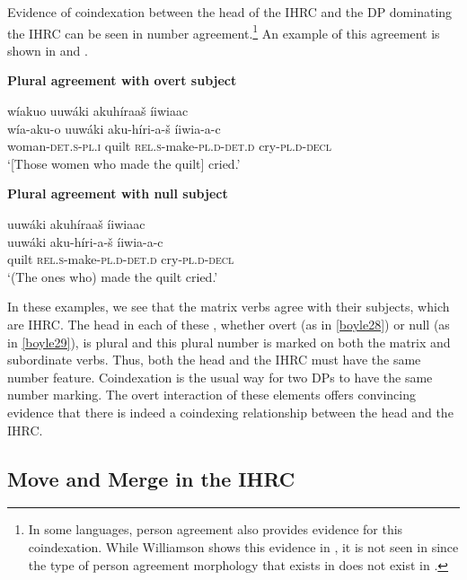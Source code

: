 \documentclass[output=paper]{LSP/langsci}
\begin{document}
Evidence of coindexation between the head of the IHRC and the DP dominating the IHRC can be seen in number agreement.\footnote{In some languages, person agreement also provides evidence for this coindexation. While Williamson shows this evidence in , it is not seen in  since the type of person agreement morphology that exists in  does not exist in .}  An example of this agreement is shown in  and .

\ea \textbf{Plural agreement with overt subject} \label{boyle28}

\glll w\'iakuo uuw\'aki akuh\'iraa\v{s} \'iiwiaac\\
w\'ia-aku-o  uuw\'aki aku-h\'iri-a-\v{s}    \'iiwia-a-c\\
woman-\textsc{det.s-pl.i}  quilt  \textsc{rel.s}-make-\textsc{pl.d-det.d} cry-\textsc{pl.d-decl}\\
\trans `[Those women who made the quilt] cried.'
\z

\ea \textbf{Plural agreement with null subject} \label{boyle29}

\glll uuw\'aki akuh\'iraa\v{s} \'iiwiaac\\
uuw\'aki aku-h\'iri-a-\v{s}   \'iiwia-a-c\\
quilt     \textsc{rel.s}-make-\textsc{pl.d}-\textsc{det.d} cry-\textsc{pl.d-decl}\\
\trans `(The ones who) made the quilt cried.'	
\z

In these examples, we see that the matrix verbs agree with their subjects, which are IHRC. The head in each of these , whether overt (as in \ref{boyle28}) or null (as in \ref{boyle29}), is plural and this plural number is marked on both the matrix and subordinate verbs. Thus, both the head and the IHRC must have the same number feature. Coindexation is the usual way for two DPs to have the same number marking. The overt interaction of these elements offers convincing evidence that there is indeed a coindexing relationship between the head and the IHRC.  
	
\subsection{Move and Merge in the  IHRC}\label{sec:boyle:5.4}
\end{document}
